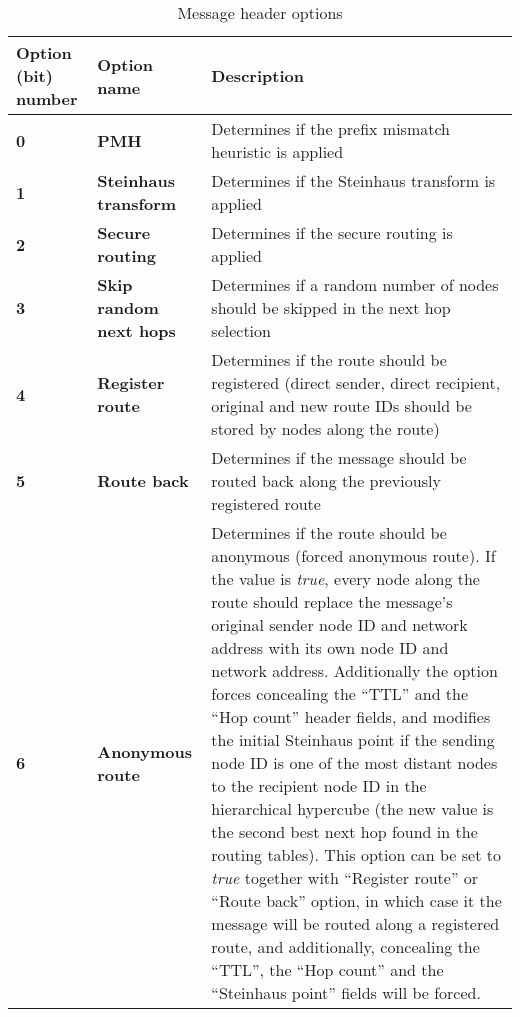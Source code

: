 \begin{table}[H]
\scriptsize
\begin{center}
\begin{tabular}{p{3cm} p{3cm} p{8.5cm}}
	\hline
	\textbf{Option (bit) number}			& \textbf{Option name}				& \textbf{Description}				\\[1mm]
    \hline
    \textbf{0}								& \textbf{PMH}						& Determines if the prefix mismatch heuristic is applied				\\[1.5mm]
	\textbf{1}								& \textbf{Steinhaus transform}		& Determines if the Steinhaus transform is applied						\\[1.5mm]
	\textbf{2}								& \textbf{Secure routing}			& Determines if the secure routing is applied							\\[1.5mm]
	\textbf{3}								& \textbf{Skip random next hops}	& Determines if a random number of nodes should be skipped in the next hop selection				\\[1.5mm]
	\textbf{4}								& \textbf{Register route}			& Determines if the route should be registered (direct sender, direct recipient, original and new route IDs should be stored by nodes along the route) 				\\[1.5mm]
	\textbf{5}								& \textbf{Route back}				& Determines if the message should be routed back along the previously registered route				\\[1.5mm]
	\textbf{6}								& \textbf{Anonymous route}			& Determines if the route should be anonymous (forced anonymous route). If the value is \emph{true}, every node along the route should replace the message's original sender node ID and network address with its own node ID and network address. Additionally the option forces concealing the ``TTL'' and the ``Hop count'' header fields, and modifies the initial Steinhaus point if the sending node ID is one of the most distant nodes to the recipient node ID in the hierarchical hypercube (the new value is the second best next hop found in the routing tables). This option can be set to \emph{true} together with ``Register route'' or ``Route back'' option, in which case it the message will be routed along a registered route, and additionally, concealing the ``TTL'', the ``Hop count'' and the ``Steinhaus point'' fields will be forced.			\\[1.5mm]
    \hline
\end{tabular}
\end{center}
\caption{Message header options}
\label{tab:protMsgHeaderOptions}
\end{table}

